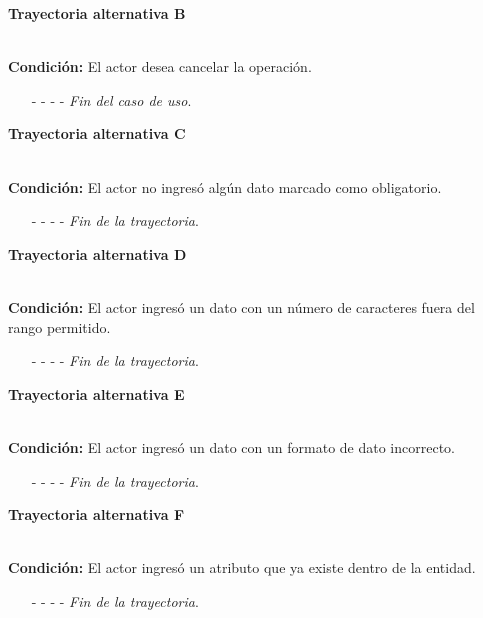 \hypertarget{CU7-1-1-2:TAB}{\textbf{Trayectoria alternativa B}}\\
\noindent \textbf{Condición:} El actor desea cancelar la operación.
\begin{enumerate}
	\UCpaso[\UCactor] Solicita cancelar la operación oprimiendo el botón  de la pantalla 
	\UCpaso[\UCsist] Muestra la pantalla .
	\item[- -] - - {\em {Fin del caso de uso}}.%
\end{enumerate}
\hypertarget{CU7-1-1-2:TAC}{\textbf{Trayectoria alternativa C}}\\
\noindent \textbf{Condición:} El actor no ingresó algún dato marcado como obligatorio.
\begin{enumerate}
	\UCpaso[\UCsist] Muestra el mensaje  señalando el campo que presenta el error en la pantalla .
	\UCpaso Regresa al paso \ref{CU7.1.2-P4} de la trayectoria principal.
	\item[- -] - - {\em {Fin de la trayectoria}}.%
\end{enumerate}
\hypertarget{CU7-1-1-2:TAD}{\textbf{Trayectoria alternativa D}}\\
\noindent \textbf{Condición:} El actor ingresó un dato con un número de caracteres fuera del rango permitido.
\begin{enumerate}
	\UCpaso[\UCsist] Muestra el mensaje  señalando el campo que presenta el error en la pantalla .
	\UCpaso Regresa al paso \ref{CU7.1.2-P4} de la trayectoria principal.
	\item[- -] - - {\em {Fin de la trayectoria}}.%
\end{enumerate}
\hypertarget{CU7-1-1-2:TAE}{\textbf{Trayectoria alternativa E}}\\
\noindent \textbf{Condición:} El actor ingresó un dato con un formato de dato incorrecto.
\begin{enumerate}
	\UCpaso[\UCsist] Muestra el mensaje  señalando el campo que presenta el error en la pantalla .
	\UCpaso Regresa al paso \ref{CU7.1.2-P4} de la trayectoria principal.
	\item[- -] - - {\em {Fin de la trayectoria}}.
\end{enumerate}
\hypertarget{CU7-1-1-2:TAF}{\textbf{Trayectoria alternativa F}}\\
\noindent \textbf{Condición:} El actor ingresó un atributo que ya existe dentro de la entidad.
\begin{enumerate}
	\UCpaso[\UCsist] Muestra el mensaje  señalando el campo que presenta la duplicidad en la pantalla .
	\UCpaso Regresa al paso \ref{CU7.1.2-P4} de la trayectoria principal.
	\item[- -] - - {\em {Fin de la trayectoria}}.
\end{enumerate}

